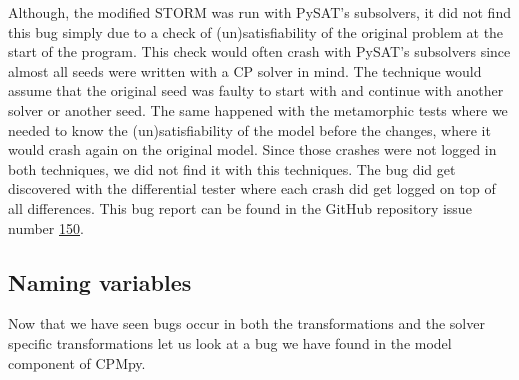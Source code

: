 Although, the modified STORM was run with PySAT's subsolvers, it did not find this bug simply due to a check of (un)satisfiability of the original problem at the start of the program. This check would often crash with PySAT's subsolvers since almost all seeds were written with a CP solver in mind. The technique would assume that the original seed was faulty to start with and continue with another solver or another seed. The same happened with the metamorphic tests where we needed to know the (un)satisfiability of the model before the changes, where it would crash again on the original model. Since those crashes were not logged in both techniques, we did not find it with this techniques. The bug did get discovered with the differential tester where each crash did get logged on top of all differences. This bug report can be found in the GitHub repository issue number \href{https://github.com/CPMpy/cpmpy/issues/150}{150}.

%
%

\subsection{Naming variables}
\label{res:bug:Naming+andImport}
Now that we have seen bugs occur in both the transformations and the solver specific transformations let us look at a bug we have found in the model component of CPMpy. 

